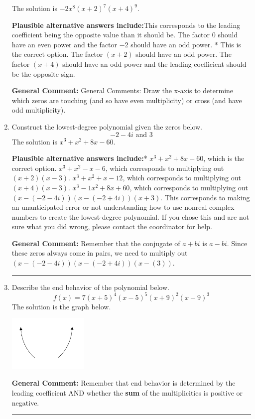 \documentclass{extbook}[14pt]
\newcommand{\litem}[1]{\item #1

\rule{\textwidth}{0.4pt}}
\begin{document}
\begin{enumerate}
{The solution is \( -2x^{8} (x + 2)^{7} (x + 4)^{9} \).\begin{enumerate}[label=\Alph*.]
\textbf{Plausible alternative answers include:}This corresponds to the leading coefficient being the opposite value than it should be.
The factor $0$ should have an even power and the factor $-2$ should have an odd power.
* This is the correct option.
The factor $(x + 2)$ should have an odd power.
The factor $(x + 4)$ should have an odd power and the leading coefficient should be the opposite sign.
\end{enumerate}

\textbf{General Comment:} General Comments: Draw the x-axis to determine which zeros are touching (and so have even multiplicity) or cross (and have odd multiplicity).
}
\litem{
Construct the lowest-degree polynomial given the zeros below.
\[ -2 - 4 i \text{ and } 3 \]The solution is \( x^{3} + x^{2} +8 x -60 \).\begin{enumerate}[label=\Alph*.]
\textbf{Plausible alternative answers include:}* $x^{3} + x^{2} +8 x -60$, which is the correct option.
$x^{3} + x^{2} -x -6$, which corresponds to multiplying out $(x + 2)(x -3)$.
$x^{3} + x^{2} +x -12$, which corresponds to multiplying out $(x + 4)(x -3)$.
$x^{3} -1 x^{2} +8 x + 60$, which corresponds to multiplying out $(x-(-2 - 4 i))(x-(-2 + 4 i))(x + 3)$.
This corresponds to making an unanticipated error or not understanding how to use nonreal complex numbers to create the lowest-degree polynomial. If you chose this and are not sure what you did wrong, please contact the coordinator for help.
\end{enumerate}

\textbf{General Comment:} Remember that the conjugate of $a+bi$ is $a-bi$. Since these zeros always come in pairs, we need to multiply out $(x-(-2 - 4 i))(x-(-2 + 4 i))(x-(3))$.
}
\litem{
Describe the end behavior of the polynomial below.
\[ f(x) = 7(x + 5)^{4}(x - 5)^{5}(x + 9)^{2}(x - 9)^{3} \]The solution is the graph below.
    \begin{center}
        \includegraphics[width=0.3\textwidth]{../Figures/polyEndBehaviorCC.png}
    \end{center}

\textbf{General Comment:} Remember that end behavior is determined by the leading coefficient AND whether the \textbf{sum} of the multiplicities is positive or negative.
}
\end{enumerate}
\end{document}
